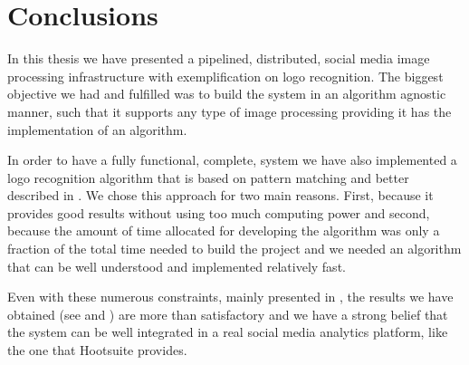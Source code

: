 \chapter{Conclusions}

In this thesis we have presented a pipelined, distributed, social media image
processing infrastructure with exemplification on logo recognition. The
biggest objective we had and fulfilled was to build the system in an
algorithm agnostic manner, such that it supports any type of image processing
providing it has the implementation of an algorithm.

In order to have a fully functional, complete, system we have also implemented
a logo recognition algorithm that is based on pattern matching and better
described in . We chose this
approach for two main reasons. First, because it provides good results without
using too much computing power and second, because the amount of time
allocated for developing the algorithm was only a fraction of the total
time needed to build the project and we needed an algorithm that can be well
understood and implemented relatively fast.

Even with these numerous constraints, mainly presented in
, the results we have obtained (see  and
) are more than satisfactory and
we have a strong belief that the system can be well integrated in a real social media
analytics platform, like the one that Hootsuite provides.
